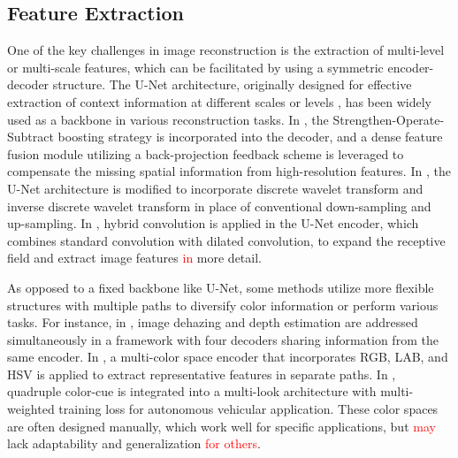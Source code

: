 \documentclass[lettersize,journal]{IEEEtran}
\begin{document}
\subsection{Feature Extraction}
\label{subsec:2.1}
One of the key challenges in image reconstruction is the extraction of multi-level or multi-scale features, which can be facilitated by using a symmetric encoder-decoder structure. The U-Net architecture, originally designed for effective extraction of context information at different scales or levels \cite{ronneberger2015u}, has been widely used as a backbone in various reconstruction tasks. In \cite{dong2020multi}, the Strengthen-Operate-Subtract boosting strategy is incorporated into the decoder, and a dense feature fusion module utilizing a back-projection feedback scheme is leveraged to compensate the missing spatial information from high-resolution features. In \cite{yang2019wavelet}, the U-Net architecture is modified to incorporate discrete wavelet transform and inverse discrete wavelet transform in place of conventional down-sampling and up-sampling. In \cite{feng2021urnet}, hybrid convolution is applied in the U-Net encoder, which combines standard convolution with dilated convolution, to expand the receptive field and extract image features \textcolor{red}{in} more detail.

As opposed to a fixed backbone like U-Net, some methods utilize more flexible structures with multiple paths to diversify color information or perform various tasks. For instance, in \cite{lee2020cnn}, image dehazing and depth estimation are addressed simultaneously in a framework with four decoders sharing information from the same encoder. In \cite{li2021underwater}, a multi-color space encoder that incorporates RGB, LAB, and HSV is applied to extract representative features in separate paths. In \cite{mehra2020reviewnet}, quadruple color-cue is integrated into a multi-look architecture with multi-weighted training loss for autonomous vehicular application. These color spaces are often designed manually, which work well for specific applications, but \textcolor{red}{may} lack adaptability and generalization \textcolor{red}{for others}.

\end{document}
